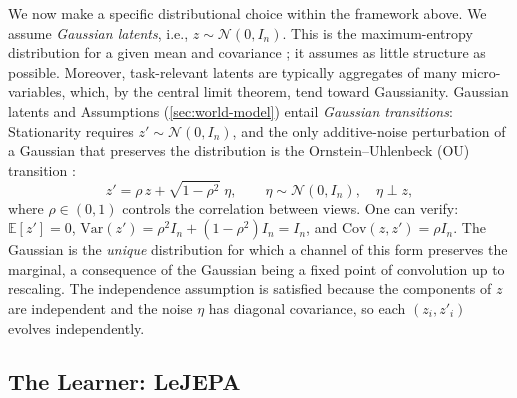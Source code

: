 \documentclass{article}
\begin{document}
We now make a specific distributional choice within the framework above.
We assume \textit{Gaussian latents}, i.e., $z \sim \mathcal{N}(0, I_n)$.
This is the maximum-entropy distribution for a given mean and covariance \citep{jaynes1957information}; it assumes as little structure as possible.
Moreover, task-relevant latents are typically aggregates of many micro-variables, which, by the central limit theorem, tend toward Gaussianity.
Gaussian latents and Assumptions (\ref{sec:world-model}) entail \textit{Gaussian transitions}:
Stationarity requires $z' \sim \mathcal{N}(0, I_n)$, and the only additive-noise perturbation of a Gaussian that preserves the distribution is the Ornstein--Uhlenbeck (OU) transition \citep{uhlenbeck1930, doob1942}:
\begin{equation}\label{eq:dgp}
    z' = \rho\, z + \sqrt{1-\rho^2}\;\eta, \qquad \eta \sim \mathcal{N}(0, I_n),\quad \eta \perp z,
\end{equation}
where $\rho \in (0,1)$ controls the correlation between views.
One can verify: $\mathbb{E}[z'] = 0$, $\mathrm{Var}(z') = \rho^2 I_n + (1-\rho^2)I_n = I_n$, and $\mathrm{Cov}(z,z') = \rho I_n$.
The Gaussian is the \textit{unique} distribution for which a channel of this form preserves the marginal, a consequence of the Gaussian being a fixed point of convolution up to rescaling.
The independence assumption is satisfied because the components of $z$ are independent and the noise $\eta$ has diagonal covariance, so each $(z_i, z'_i)$ evolves independently.


\subsection{The Learner: LeJEPA}\label{sec:objective}
\end{document}
